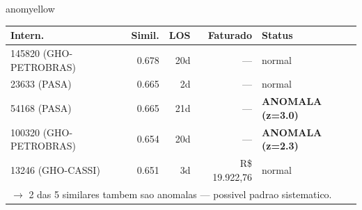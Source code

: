 \documentclass[a4paper,10pt]{article}
\begin{document}
\begin{anomalycard}[Internacao 47 | GHO-ICS | MODERADO (z=2.69)]{anomyellow}
\begin{tabular}{l r r r l}\toprule\textbf{Intern.} & \textbf{Simil.} & \textbf{LOS} & \textbf{Faturado} & \textbf{Status} \\\midrule
145820 (GHO-PETROBRAS) & 0.678 & 20d & --- & \textcolor{jcubeblue}{normal} \\
23633 (PASA) & 0.665 & 2d & --- & \textcolor{jcubeblue}{normal} \\
54168 (PASA) & 0.665 & 21d & --- & \textcolor{anomred}{\textbf{ANOMALA (z=3.0)}} \\
100320 (GHO-PETROBRAS) & 0.654 & 20d & --- & \textcolor{anomred}{\textbf{ANOMALA (z=2.3)}} \\
13246 (GHO-CASSI) & 0.651 & 3d & R\$ 19.922,76 & \textcolor{jcubeblue}{normal} \\
\multicolumn{5}{l}{\textcolor{anomred}{\small $\rightarrow$ 2 das 5 similares tambem sao anomalas --- possivel padrao sistematico.}} \\
\bottomrule\end{tabular}


\end{anomalycard}

\newpage
\end{document}
